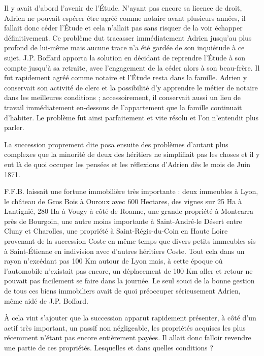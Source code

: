 \documentclass[11pt,a4paper]{report}
\begin{document}
Il y avait d'abord l'avenir de l'Étude. N'ayant pas encore sa licence de droit, Adrien ne pouvait espérer être agréé comme notaire avant plusieurs années, il fallait donc céder l'Étude et cela n'allait pas sans risquer de la voir échapper définitivement. Ce problème dut tracasser immédiatement Adrien jusqu'au plus profond de lui-même mais aucune trace n'a été gardée de son inquiétude à ce sujet. J.P. Boffard apporta la solution en décidant de reprendre l'Étude à son compte jusqu'à sa retraite, avec l'engagement de la céder alors à son beau-frère. Il fut rapidement agréé comme notaire et l'Étude resta dans la famille. Adrien y conservait son activité de clerc et la possibilité d'y apprendre le métier de notaire dans les meilleures conditions ; accessoirement, il conservait aussi un lieu de travail immédiatement en-dessous de l'appartement que la famille continuait d'habiter. Le problème fut ainsi parfaitement et vite résolu et l'on n'entendit plus parler.

La succession proprement dite posa ensuite des problèmes d'autant plus complexes que la minorité de deux des héritiers ne simplifiait pas les choses et il y eut là de quoi occuper les pensées et les réflexions d'Adrien dès le mois de Juin 1871.


F.F.B. laissait une fortune immobilière très importante : deux immeubles à Lyon, le château de Gros Bois à Ouroux avec 600 Hectares, des vignes sur 25 Ha à Lantignié, 280 Ha à Vougy à côté de Roanne, une grande propriété à Montcarra près de Bourgoin, une autre moins importante à Saint-André-le Désert entre Cluny et Charolles, une propriété à Saint-Régis-du-Coin en Haute Loire provenant de la succession Coste en même temps que divers petits immeubles sis à Saint-Étienne en indivision avec d'autres héritiers Coste. Tout cela dans un rayon n'excédant pas 100 Km autour de Lyon mais, à cette époque où l'automobile n'existait pas encore, un déplacement de 100 Km aller et retour ne pouvait pas facilement se faire dans la journée. Le seul souci de la bonne gestion de tous ces biens immobiliers avait de quoi préoccuper sérieusement Adrien, même aidé de J.P. Boffard.

À cela vint s'ajouter que la succession apparut rapidement présenter, à côté d'un actif très important, un passif non négligeable, les propriétés acquises les plus récemment n'étant pas encore entièrement payées. Il allait donc falloir revendre une partie de ces propriétés. Lesquelles et dans quelles conditions ?
\end{document}
